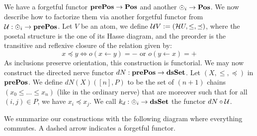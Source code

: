 We have a forgetful functor \( \mathbf{prePos} \to \mathbf{Pos} \) and another \( \eye_i \to \Pos \). We now describe how to factorize them via another forgetful functor from \( \U : \eye_i \to \prePos \). Let \( V \) be an atom, we define \( \mathcal{U} V := (\mathcal{H} U, \le, \preceq)  \), where the posetal structure is the one of its Hasse diagram, and the preorder is the transitive and reflexive closure of the relation given by:
\begin{equation*}
    x \preceq y \iff o(x \leftarrow y) = - \text{ or } o(y \leftarrow x) = +
\end{equation*}   
As inclusions preserve orientation, this construction is functorial. We may now construct the directed nerve functor \( dN : \mathbf{prePos} \to \mathbf{dsSet} \). Let \( (X, \le, \preceq) \) in \( \mathbf{prePos} \). We define \( dN(X)([n], P) \) to be the set of \( (n+1) \) chains \( (x_0 \le \dots \le x_n ) \) (like in the ordinary nerve) that are moreover such that for all \( (i, j) \in P \), we have \( x_i \preceq x_j \). We call \( k_d : \eye_i \to \dsSet \) the functor \( dN \circ \mathcal{U} \).

We summarize our constructions with the following diagram where everything commutes. A dashed arrow indicates a forgetful functor.
\begin{center}
\end{center}

